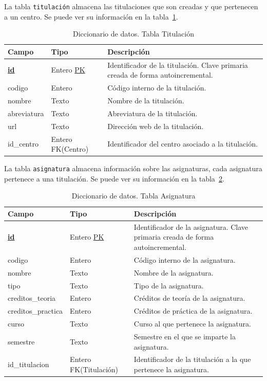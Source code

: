 La tabla \texttt{titulación} almacena las titulaciones que son creadas y que pertenecen a un centro.
Se puede ver su información en la tabla~\ref{tab:diccionario_titulacion}.
\begin{table}
  \centering 
  \begin{tabular}{l p{} p{}}
    \toprule
    \textbf{Campo} & \textbf{Tipo} & \textbf{Descripción}\\
    \midrule
    \textbf{\underline{id}} & Entero \underline{PK} & Identificador de la titulación. Clave primaria creada de forma autoincremental. \\ \addlinespace
    codigo & Entero & Código interno de la titulación. \\ \addlinespace
    nombre & Texto & Nombre de la titulación. \\ \addlinespace
    abreviatura & Texto & Abreviatura de la titulación. \\ \addlinespace
    url & Texto & Dirección web de la titulación. \\ \addlinespace
    id\_centro & Entero FK(Centro) & Identificador del centro asociado a la titulación. \\
    \bottomrule
  \end{tabular}
  \caption{Diccionario de datos. Tabla Titulación}
  \label{tab:diccionario_titulacion}
\end{table}

La tabla \texttt{asignatura} almacena información sobre las asignaturas, cada asignatura pertenece a una titulación. Se puede ver su información en la tabla~\ref{tab:diccionario_asignatura}.

\begin{table}
  \centering 
  \begin{tabular}{l p{} p{}}
    \toprule
    \textbf{Campo} & \textbf{Tipo} & \textbf{Descripción}\\
    \midrule
    \textbf{\underline{id}} & Entero \underline{PK} & Identificador de la asignatura. Clave primaria creada de forma autoincremental. \\ \addlinespace
    codigo & Entero & Código interno de la asignatura. \\ \addlinespace
    nombre & Texto & Nombre de la asignatura. \\ \addlinespace
    tipo & Texto & Tipo de la asignatura. \\ \addlinespace
    creditos\_teoria & Entero & Créditos de teoría de la asignatura. \\ \addlinespace
    creditos\_practica & Entero & Créditos de práctica de la asignatura. \\ \addlinespace
    curso & Texto & Curso al que pertenece la asignatura. \\ \addlinespace
    semestre & Texto & Semestre en el que se imparte la asignatura. \\ \addlinespace
    id\_titulacion & Entero FK(Titulación) & Identificador de la titulación a la que pertenece la asignatura. \\
    \bottomrule
  \end{tabular}
  \caption{Diccionario de datos. Tabla Asignatura}
  \label{tab:diccionario_asignatura}
\end{table}

